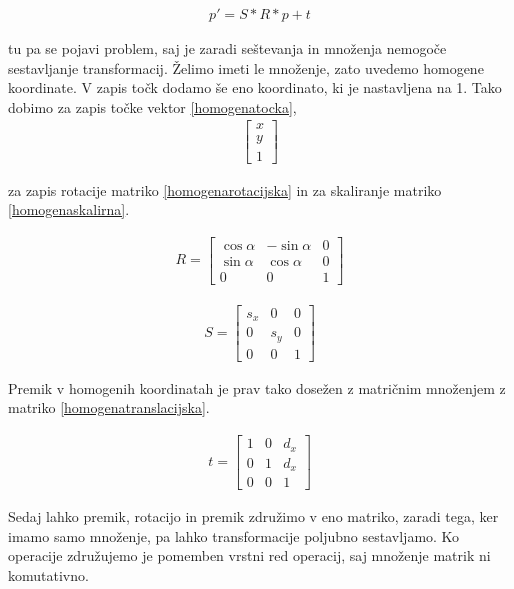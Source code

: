 \documentclass[a4paper, 12pt]{book}
\begin{document}
\begin{align}
p'
=
S*R*p+t
\label{osnovnatransformacija}
\end{align}

tu pa se pojavi problem, saj je zaradi seštevanja in množenja nemogoče sestavljanje transformacij. Želimo imeti le množenje, zato uvedemo homogene koordinate. V zapis točk dodamo še eno koordinato, ki je nastavljena na 1. Tako dobimo za zapis točke vektor \ref{homogenatocka},
\begin{align}
\begin{bmatrix}
x \\ y \\ 1
\end{bmatrix}
\label{homogenatocka}
\end{align}

za zapis rotacije matriko \ref{homogenarotacijska} in za skaliranje matriko \ref{homogenaskalirna}.

\begin{align}
R
=
\begin{bmatrix}
\cos\alpha & -\sin\alpha & 0 \\
\sin\alpha & \cos\alpha & 0 \\
0 & 0 & 1
\end{bmatrix}
\label{homogenarotacijska}
\end{align}

\begin{align}
S
=
\begin{bmatrix}
s_x & 0 & 0 \\
0 & s_y & 0 \\
0 & 0 & 1 
\end{bmatrix}
\label{homogenaskalirna}
\end{align}

Premik v homogenih koordinatah je prav tako dosežen z matričnim množenjem z matriko \ref{homogenatranslacijska}.

\begin{align}
t
=
\begin{bmatrix}
1 & 0 & d_x \\ 
0 & 1 & d_x \\
0 & 0 & 1
\end{bmatrix}
\label{homogenatranslacijska}
\end{align}

Sedaj lahko premik, rotacijo in premik združimo v eno matriko, zaradi tega, ker imamo samo množenje, pa lahko transformacije poljubno sestavljamo. Ko operacije združujemo je pomemben vrstni red operacij, saj množenje matrik ni komutativno. 
\end{document}
